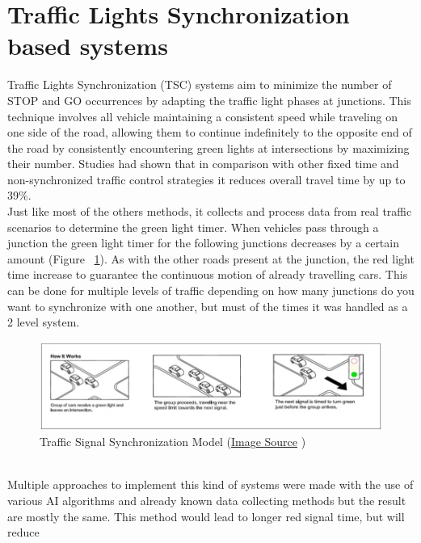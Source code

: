 \documentclass[17pt]{report}
\begin{document}
\section{Traffic Lights Synchronization based systems}
\indent \indent
Traffic Lights Synchronization (TSC) \cite{Tomar2022} systems aim  to minimize
the number of STOP and GO occurrences by adapting the traffic light phases at junctions.
This technique involves all vehicle maintaining a consistent speed while traveling on one side
of the road, allowing them to continue indefinitely to the opposite end of the road by consistently
encountering green lights at intersections by maximizing their number.
Studies had shown that in comparison with other fixed time and
non-synchronized traffic control strategies it reduces overall travel time by
up to 39\%. \cite{ALEKO2019}\\
\indent \indent
Just like most of the others methods, it collects and process data from real traffic
scenarios to determine the green light timer. When vehicles pass through a junction the
green light timer for the following junctions decreases by a certain amount
(Figure ~\ref{fig:TrafficSignalSynchronization}). As with the other roads present at
the junction, the red light time increase to guarantee the continuous motion of already
travelling cars. This can be done for multiple levels of traffic depending on how many
junctions do you want to synchronize with one another, but must of the times it
was handled as a 2 level system.
\begin{figure}[h!]
    \includegraphics[width=\textwidth]{TrafficSignalSynchronization.jpg}
    \caption{Traffic Signal Synchronization Model 
    (\href{https://www.cityofirvine.org/signal-operations-maintenance/traffic-signal-synchronization}{Image Source} \textcopyright)}
    \label{fig:TrafficSignalSynchronization}
\end{figure}\\
\indent \indent
Multiple approaches to implement this kind of systems were made with the use of
various AI algorithms and already known data collecting methods but the result are
mostly the same. This method would lead to longer red signal time, but will reduce
\end{document}
